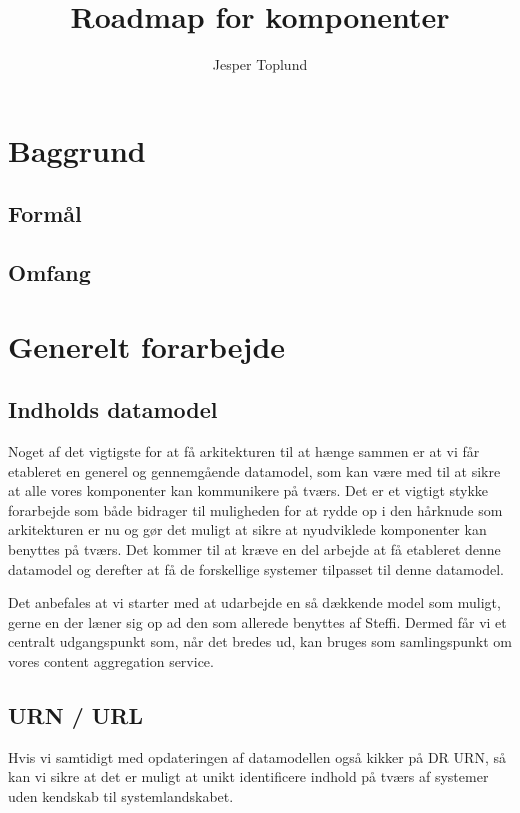 \documentclass{article}
\author {Jesper Toplund}
\title{Roadmap for komponenter}
\date{}
\begin{document}
\maketitle

\vspace{20 mm}
\begin{quote}
    \textit{}
\end{quote}
\newpage{}
\clearpage

\section{Baggrund}
\subsection{Formål}


\subsection{Omfang}

\section{Generelt forarbejde}
\subsection{Indholds datamodel}
Noget af det vigtigste for at få arkitekturen til at hænge sammen er at vi får etableret en generel og gennemgående datamodel, som kan være med til at sikre at alle vores komponenter kan kommunikere på tværs. Det er et vigtigt stykke forarbejde som både bidrager til muligheden for at rydde op i den hårknude som arkitekturen er nu og gør det muligt at sikre at nyudviklede komponenter kan benyttes på tværs. Det kommer til at kræve en del arbejde at få etableret denne datamodel og derefter at få de forskellige systemer tilpasset til denne datamodel.

Det anbefales at vi starter med at udarbejde en så dækkende model som muligt, gerne en der læner sig op ad den som allerede benyttes af Steffi. Dermed får vi et centralt udgangspunkt som, når det bredes ud, kan bruges som samlingspunkt om vores content aggregation service.
\subsection{URN / URL}
Hvis vi samtidigt med opdateringen af datamodellen også kikker på DR URN, så kan vi sikre at det er muligt at unikt identificere indhold på tværs af systemer uden kendskab til systemlandskabet.
\end{document}
